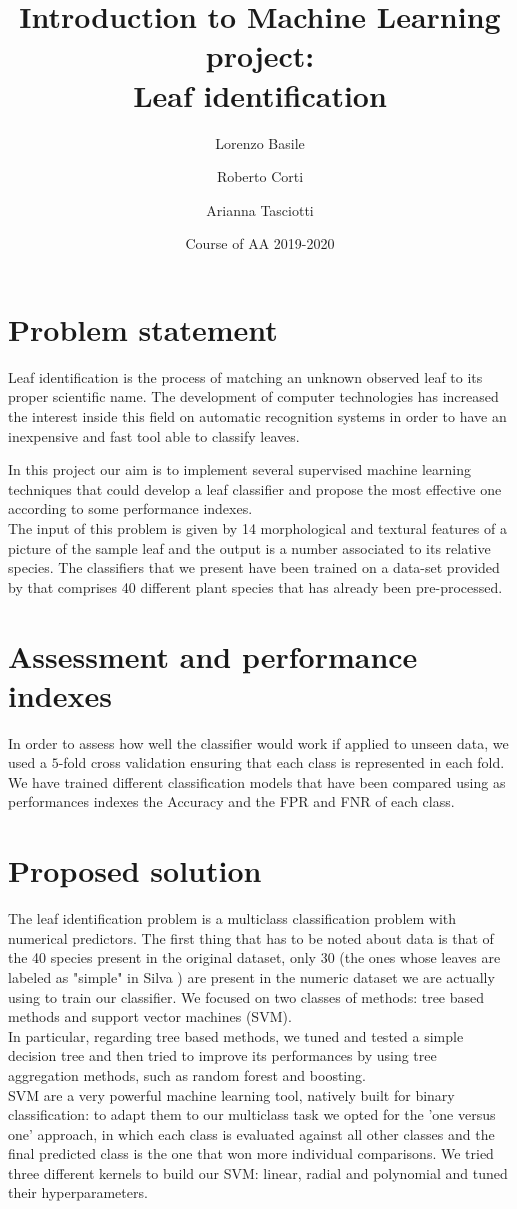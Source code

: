 \documentclass{article}
\title{Introduction to Machine Learning project:\\ Leaf identification}
\author[1]{Lorenzo Basile}
\author[2]{Roberto Corti}
\author[3]{Arianna Tasciotti}
\affil[1,2,3]{
    problem statement,
    solution design,
    solution development,
    writing
}
\date{Course of AA 2019-2020}
\begin{document}
\maketitle



\section{Problem statement}
Leaf identification is the process of matching an unknown observed leaf to its proper scientific name. The development of computer technologies has increased the interest inside this field on automatic recognition systems in order to have an inexpensive and fast tool able to classify leaves.  

In this project our aim is to implement several supervised machine learning techniques that could develop a leaf classifier and propose the most effective one according to some performance indexes. \\
The input of this problem is given by 14 morphological and textural features of a picture of the sample leaf and the output is a number associated to its relative species. The classifiers that we present have been trained on a data-set provided by \cite{silva} that comprises 40 different plant species that has already been pre-processed.


\section{Assessment and performance indexes}
In order to assess how well the classifier would work if applied to unseen data, we used a $5$-fold cross validation ensuring that each class is represented in each fold. We have trained different classification models that have been compared using as performances indexes the Accuracy and the FPR and FNR of each class.

\section{Proposed solution}
The leaf identification problem is a multiclass classification problem with numerical predictors. The first thing that has to be noted about data is that of the 40 species present in the original dataset, only 30 (the ones whose leaves are labeled as "simple" in Silva \cite{silva}) are present in the numeric dataset we are actually using to train our classifier. We focused on two classes of methods: tree based methods and support vector machines (SVM).
\\In particular, regarding tree based methods, we tuned and tested a simple decision tree and then tried to improve its performances by using tree aggregation methods, such as random forest and boosting. 
\\SVM are a very powerful machine learning tool, natively built for binary classification: to adapt them to our multiclass task we opted for the 'one versus one' approach, in which each class is evaluated against all other classes and the final predicted class is the one that won more individual comparisons. We tried three different kernels to build our SVM: linear, radial and polynomial and tuned their hyperparameters.
\end{document}
